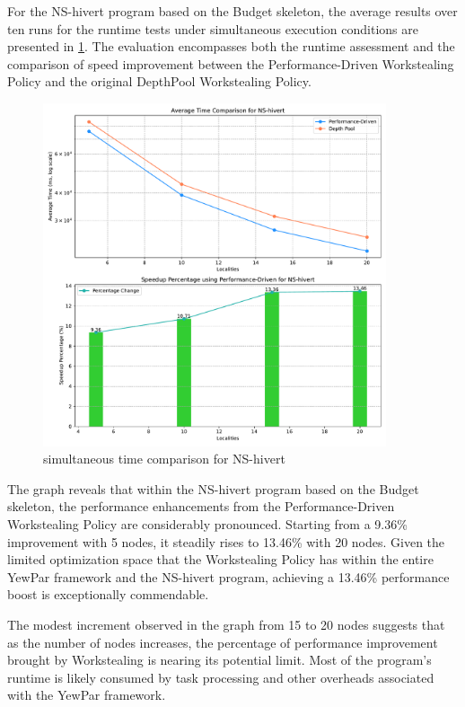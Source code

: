 \documentclass{mproj}
\begin{document}
For the NS-hivert program based on the Budget skeleton, the average results over ten runs for the runtime tests under simultaneous execution conditions are presented in \ref{fig:time_comparison_ns_simu}.
The evaluation encompasses both the runtime assessment and the comparison of speed improvement between the Performance-Driven Workstealing Policy and the original DepthPool Workstealing Policy.

\begin{figure}[h]
    \centering
    \includegraphics[width=0.9\textwidth]{images/time_comparison_ns_simultaneously.pdf}
    \caption{simultaneous time comparison for NS-hivert}
    \label{fig:time_comparison_ns_simu}
\end{figure}
\FloatBarrier

The graph reveals that within the NS-hivert program based on the Budget skeleton,
the performance enhancements from the Performance-Driven Workstealing Policy are considerably pronounced.
Starting from a 9.36\% improvement with 5 nodes, it steadily rises to 13.46\% with 20 nodes.
Given the limited optimization space that the Workstealing Policy has within the entire YewPar framework and the NS-hivert program,
achieving a 13.46\% performance boost is exceptionally commendable.

The modest increment observed in the graph from 15 to 20 nodes suggests that
as the number of nodes increases, the percentage of performance improvement brought by Workstealing is nearing its potential limit.
Most of the program's runtime is likely consumed by task processing and other overheads associated with the YewPar framework.
\end{document}
